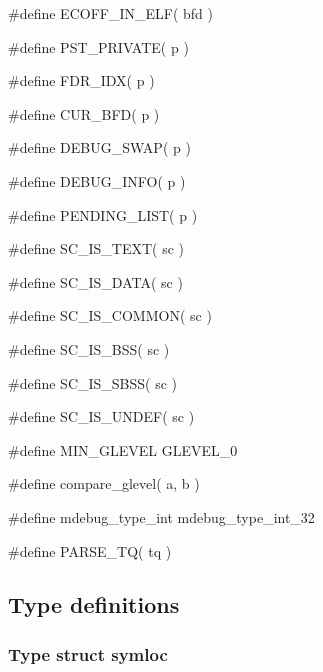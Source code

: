 {\stt \#define ECOFF\_IN\_ELF( bfd )}

\medskip
{\stt \#define PST\_PRIVATE( p )}

\medskip
{\stt \#define FDR\_IDX( p )}

\medskip
{\stt \#define CUR\_BFD( p )}

\medskip
{\stt \#define DEBUG\_SWAP( p )}

\medskip
{\stt \#define DEBUG\_INFO( p )}

\medskip
{\stt \#define PENDING\_LIST( p )}

\medskip
{\stt \#define SC\_IS\_TEXT( sc )}

\medskip
{\stt \#define SC\_IS\_DATA( sc )}

\medskip
{\stt \#define SC\_IS\_COMMON( sc )}

\medskip
{\stt \#define SC\_IS\_BSS( sc )}

\medskip
{\stt \#define SC\_IS\_SBSS( sc )}

\medskip
{\stt \#define SC\_IS\_UNDEF( sc )}

\medskip
{\stt \#define MIN\_GLEVEL GLEVEL\_0}

\medskip
{\stt \#define compare\_glevel( a, b )}

\medskip
{\stt \#define mdebug\_type\_int mdebug\_type\_int\_32}

\medskip
{\stt \#define PARSE\_TQ( tq )}


\subsection{Type definitions}


\subsubsection{Type struct symloc}
\label{type_struct_symloc_mdebugread.c}

